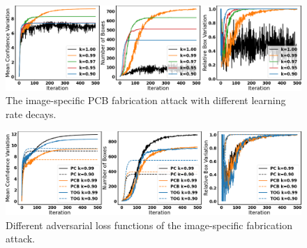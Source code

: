 




\begin{figure}[btph]
    \centering
    \includegraphics[width=0.80\linewidth]{figures/chapter_detection/hardware/lr.png}
    \caption{The  image-specific  PCB fabrication attack with different learning rate decays.}
    \label{fig:decay}
\end{figure}

\begin{figure}[btph]
    \centering
    \includegraphics[width=0.80\linewidth]{figures/chapter_detection/hardware/loss.png}
    \caption{Different adversarial loss functions of the  image-specific  fabrication attack.}
    \label{fig:loss}
\end{figure}

